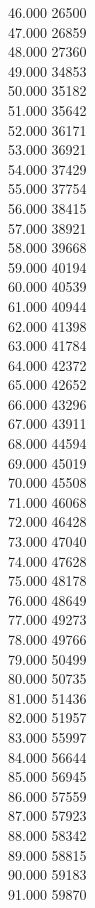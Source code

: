 { 46.000	26500 \\
 47.000	26859 \\
 48.000	27360 \\
 49.000	34853 \\
 50.000	35182 \\
 51.000	35642 \\
 52.000	36171 \\
 53.000	36921 \\
 54.000	37429 \\
 55.000	37754 \\
 56.000	38415 \\
 57.000	38921 \\
 58.000	39668 \\
 59.000	40194 \\
 60.000	40539 \\
 61.000	40944 \\
 62.000	41398 \\
 63.000	41784 \\
 64.000	42372 \\
 65.000	42652 \\
 66.000	43296 \\
 67.000	43911 \\
 68.000	44594 \\
 69.000	45019 \\
 70.000	45508 \\
 71.000	46068 \\
 72.000	46428 \\
 73.000	47040 \\
 74.000	47628 \\
 75.000	48178 \\
 76.000	48649 \\
 77.000	49273 \\
 78.000	49766 \\
 79.000	50499 \\
 80.000	50735 \\
 81.000	51436 \\
 82.000	51957 \\
 83.000	55997 \\
 84.000	56644 \\
 85.000	56945 \\
 86.000	57559 \\
 87.000	57923 \\
 88.000	58342 \\
 89.000	58815 \\
 90.000	59183 \\
 91.000	59870 \\
}
